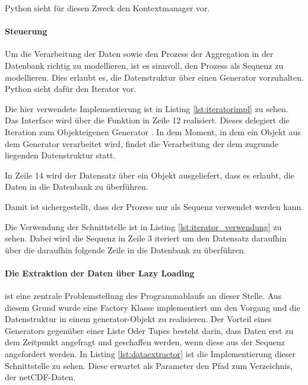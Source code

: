 Python sieht für diesen Zweck den Kontextmanager vor.




\paragraph{Steuerung}

Um die Verarbeitung der Daten sowie den Prozess der Aggregation in der Datenbank richtig zu modellieren, ist es sinnvoll, den Prozess als Sequenz zu modellieren. Dies erlaubt es, die Datenstruktur über einen Generator vorzuhalten. Python sieht dafür den Iterator vor.

Die hier verwendete Implementierung ist in Listing \ref{lst:iteratorimpl} zu sehen. Das Interface wird über die Funktion  in Zeile 12 realisiert. 
Dieses delegiert die Iteration zum Objekteigenen Generator . In dem Moment, in dem ein Objekt aus dem Generator verarbeitet wird, findet die Verarbeitung der dem zugrunde liegenden Datenstruktur statt.

In Zeile 14 wird der Datensatz über ein Objekt ausgeliefert, dass es erlaubt, die Daten in die Datenbank zu überführen.

Damit ist sichergestellt, dass der Prozess nur als Sequenz verwendet werden kann.


Die Verwendung der Schnittstelle ist in Listing \ref{lst:iterator_verwendung} zu sehen. Dabei wird die Sequenz in Zeile 3 iteriert um den Datensatz daraufhin über die daraufhin folgende Zeile in die Datenbank zu überführen.

    
    
    
\paragraph{Die Extraktion der Daten über Lazy Loading} ist eine zentrale Problemstellung des Programmablaufs an dieser Stelle. Aus diesem Grund wurde eine Factory Klasse implementiert um den Vorgang und die Datenstruktur in einem generator-Objekt zu realisieren. Der Vorteil eines Generators gegenüber einer Liste Oder Tupes besteht darin, dass Daten erst zu dem Zeitpunkt angefragt und geschaffen werden, wenn diese aus der Sequenz angefordert werden. In Listing \ref{lst:dataextractor} ist die Implementierung dieser Schnittstelle zu sehen. Diese erwartet als Parameter den Pfad zum Verzeichnis, der netCDF-Daten. 

